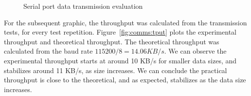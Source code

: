 %
\begin{figure}[h!]
	\centering     %
	\caption{Serial port data transmission evaluation}
\end{figure}

For the subsequent graphic, the throughput was calculated from the transmission tests, for every test repetition.
Figure~\ref{fig:comms:tput} plots the experimental throughput and theoretical throughput. The theoretical throughput was calculated from the baud rate \(115200/8 = 14.06 KB/s\).
We can observe the experimental throughput starts at around 10 KB/s for smaller data sizes, and stabilizes around 11 KB/s, as size increases.
We can conclude the practical throughput is close to the theoretical, and as expected, stabilizes as the data size increases.

